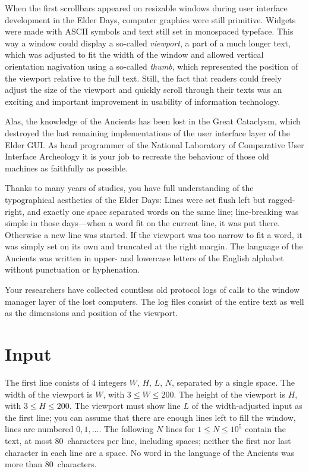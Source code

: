
When the first scrollbars appeared on resizable windows during user interface development in the Elder Days, computer graphics were still primitive.
Widgets were made with ASCII symbols and text still set in monospaced typeface.
This way a window could display a so-called \emph{viewport}, a part of a much longer text, which was adjusted to fit the width of the window and allowed vertical orientation nagivation using a so-called \emph{thumb}, which represented the position of the viewport relative to the full text.
Still, the fact that readers could freely adjust the size of the viewport and quickly scroll through their texts was an exciting and important improvement in usability of information technology.

Alas, the knowledge of the Ancients has been lost in the Great Cataclysm, which destroyed the last remaining implementations of the user interface layer of the Elder GUI. 
As head programmer of the National Laboratory of Comparative User Interface Archeology it is your job to recreate the behaviour of those old machines as faithfully as possible.

Thanks to many years of studies, you have full understanding of the typographical aesthetics of the Elder Days:
Lines were set flush left but ragged-right, and exactly one space separated words on the same line; line-breaking was simple in those days---when a word fit on the current line, it was put there.
Otherwise a new line was started.
If the viewport was too narrow to fit a word, it was simply set on its own and truncated at the right margin. 
The language of the Ancients was written in upper- and lowercase letters of the English alphabet without punctuation or hyphenation.

Your researchers have collected countless old protocol logs of calls to the window manager layer of the lost computers.
The log files consist of the entire text as well as the dimensions and position of the viewport.

\section*{Input}

The first line conists of $4$ integers $W$, $H$, $L$, $N$, separated by a single space.
The width of the viewport is $W$, with $3\leq W\leq 200$.
The height of the viewport is $H$, with $3\leq H\leq 200$.
The viewport must show line $L$ of the width-adjusted input as the first line; you can assume that there are enough lines left to fill the window, lines are numbered $0,1,\ldots$.
The following $N$ lines for $1\leq N\leq 10^5$ contain the text, at most 80~characters per line, including spaces; neither the first nor last character in each line are a space. 
No word in the language of the Ancients was more than 80~characters.



